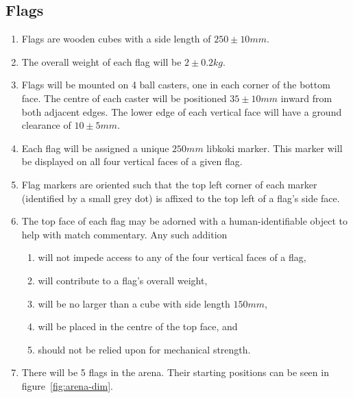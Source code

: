 \subsection{Flags}
\label{sub:Flags}
\begin{enumerate}
\item Flags are wooden cubes with a side length of $250 \pm 10 mm$.

\item The overall weight of each flag will be $2 \pm 0.2 kg$.

\item Flags will be mounted on 4 ball casters, one in each corner of the bottom face.
      The centre of each caster will be positioned $35 \pm 10 mm$ inward from both adjacent edges.
      The lower edge of each vertical face will have a ground clearance of $10 \pm 5 mm$.

\item Each flag will be assigned a unique $250mm$ libkoki marker.
      This marker will be displayed on all four vertical faces of a given flag.

\item Flag markers are oriented such that the top left corner of each marker (identified by a small grey dot) is affixed to the top left of a flag's side face.

\item The top face of each flag may be adorned with a human-identifiable object to help with match commentary.
      Any such addition
      \begin{enumerate}
            \item will not impede access to any of the four vertical faces of a flag,
            \item will contribute to a flag's overall weight,
            \item will be no larger than a cube with side length $150mm$,
            \item will be placed in the centre of the top face, and
            \item should not be relied upon for mechanical strength.
      \end{enumerate}

\item There will be 5 flags in the arena.
      Their starting positions can be seen in figure~\ref{fig:arena-dim}.

\end{enumerate}

\clearpage
